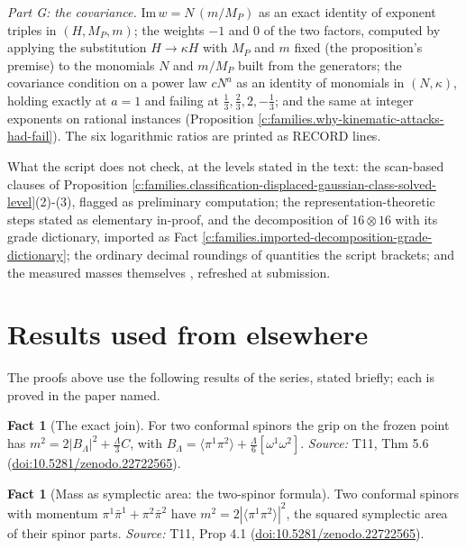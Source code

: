 \documentclass[11pt]{article}
\theoremstyle{definition}
\newtheorem{fact}[theorem]{Fact}
\theoremstyle{plain}
\providecommand{\br}{}\renewcommand{\br}[1]{\langle #1\rangle}
\begin{document}
\emph{Part G: the covariance.} $\mathrm{Im}\,w = N\,(m/M_{P})$ as an exact identity of exponent triples in $(H, M_{P}, m)$; the weights $-1$ and $0$ of the two factors, computed by applying the substitution $H \to \kappa H$ with $M_{P}$ and $m$ fixed (the proposition's premise) to the monomials $N$ and $m/M_{P}$ built from the generators; the covariance condition on a power law $cN^{a}$ as an identity of monomials in $(N, \kappa)$, holding exactly at $a = 1$ and failing at $\tfrac13, \tfrac23, 2, -\tfrac13$; and the same at integer exponents on rational instances (Proposition \ref{c:families.why-kinematic-attacks-had-fail}). The six logarithmic ratios are printed as RECORD lines.

What the script does not check, at the levels stated in the text: the scan-based clauses of Proposition \ref{c:families.classification-displaced-gaussian-class-solved-level}(2)-(3), flagged as preliminary computation; the representation-theoretic steps stated as elementary in-proof, and the decomposition of $16 \otimes 16$ with its grade dictionary, imported as Fact \ref{c:families.imported-decomposition-grade-dictionary}; the ordinary decimal roundings of quantities the script brackets; and the measured masses themselves \cite{PDG2024}, refreshed at submission.

\section{Results used from elsewhere}
The proofs above use the following results of the series, stated briefly; each is proved in the paper named.

\begin{fact}[The exact join]\label{c:mass.exact-join}
For two conformal spinors the grip on the frozen point has $m^{2} = 2|B_{\Lambda}|^{2} + \tfrac{\Lambda}{3}C$, with $B_{\Lambda} = \br{\pi^{1}\pi^{2}} + \tfrac{\Lambda}{6}[\omega^{1}\omega^{2}]$.
\emph{Source:} T11, Thm 5.6 (\href{https://doi.org/10.5281/zenodo.22722565}{doi:10.5281/zenodo.22722565}).
\end{fact}

\begin{fact}[Mass as symplectic area: the two-spinor formula]\label{c:mass.mass-symplectic-area-two-twistor-formula}
Two conformal spinors with momentum $\pi^{1}\bar\pi^{1} + \pi^{2}\bar\pi^{2}$ have $m^{2} = 2|\br{\pi^{1}\pi^{2}}|^{2}$, the squared symplectic area of their spinor parts.
\emph{Source:} T11, Prop 4.1 (\href{https://doi.org/10.5281/zenodo.22722565}{doi:10.5281/zenodo.22722565}).
\end{fact}
\end{document}
